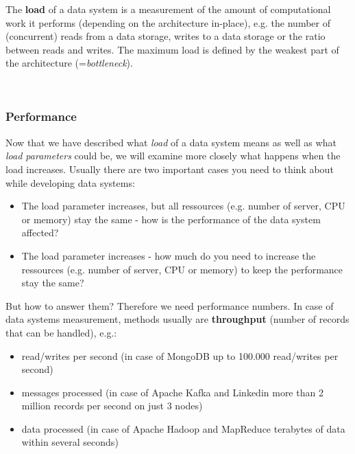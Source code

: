 \begin{minipage}{0.8\textwidth}\raggedright
The \textbf{load} of a data system is a measurement of the amount of computational work it performs (depending on the architecture in-place), e.g. the number of (concurrent) reads from a data storage, writes to a data storage or the ratio between reads and writes. The maximum load is defined by the weakest part of the architecture (=\textit{bottleneck}). \\[0.4 cm]
\end{minipage}\\

\subsubsection{Performance}
\label{tf_nfreq_scalability_performance}
Now that we have described what \textit{load} of a data system means as well as what \textit{load parameters} could be, we will examine more closely what happens when the load increases. Usually there are two important cases you need to think about while developing data systems:\\
\begin{samepage}
\begin{itemize}
			\item The load parameter increases, but all ressources (e.g. number of server, CPU or memory) stay the same - how is the performance of the data system affected?
			\item The load parameter increases - how much do you need to increase the ressources (e.g. number of server, CPU or memory) to keep the performance stay the same?\\
\end{itemize}
\end{samepage}

But how to answer them? Therefore we need performance numbers. In case of data systems measurement, methods usually are \textbf{throughput} (number of records that can be handled), e.g.:
\begin{itemize}
			\item read/writes per second (in case of MongoDB up to 100.000 read/writes per second)
			\item messages processed (in case of Apache Kafka and Linkedin more than 2 million records per second on just 3 nodes)
			\item data processed (in case of Apache Hadoop and MapReduce terabytes of data within several seconds)\\
\end{itemize}

